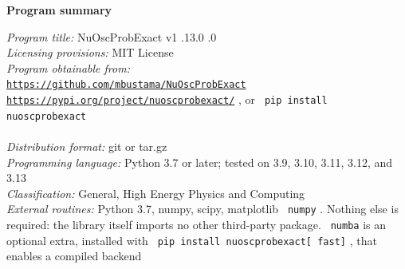 \documentclass[final,5p,times,twocolumn]{elsarticle}
\providecommand{\DIFaddtex}[1]{{\protect\color{blue} \sf #1}} %
\providecommand{\DIFdeltex}[1]{{\protect\color{red} \scriptsize #1}} %
\providecommand{\DIFaddbegin}{} %
\providecommand{\DIFaddend}{} %
\providecommand{\DIFdelbegin}{} %
\providecommand{\DIFdelend}{} %
\providecommand{\DIFadd}[1]{\DIFaddtex{#1}} %
\providecommand{\DIFdel}[1]{\DIFdeltex{#1}} %
\begin{document}
\noindent
{\bf Program summary}
\smallskip

\begin{small}

\noindent
{\em Program title:} NuOscProbExact v1\DIFaddbegin \DIFadd{.13}\DIFaddend .0    \DIFdelbegin \DIFdel{.0    }\DIFdelend \\
\smallskip
{\em Licensing provisions:} MIT License  \\
\smallskip
{\em Program obtainable from:} \\
\href{https://github.com/mbustama/NuOscProbExact}{\tt https://github.com/mbustama/NuOscProbExact}  \\
\DIFaddbegin \href{https://pypi.org/project/nuoscprobexact/}{\tt https://pypi.org/project/nuoscprobexact/}\DIFadd{, or }{\tt \DIFadd{pip install nuoscprobexact}}  \DIFaddend \\ \DIFaddbegin \\
\DIFaddend \smallskip
\DIFaddbegin {\em \DIFadd{Distribution format:}} \DIFadd{git or tar.gz }\\
\smallskip
\DIFaddend %
{\em Programming language:} Python \DIFdelbegin \DIFdel{3.7   }\DIFdelend \DIFaddbegin \DIFadd{3.9 or later; tested on 3.9, 3.10, 3.11, 3.12, and 3.13   }\DIFaddend \\
\smallskip
\DIFaddbegin {\em \DIFadd{Classification:}} \DIFadd{11.1 General, High Energy Physics and Computing   }\\
\smallskip
\DIFaddend %
{\em External routines:} \DIFdelbegin \DIFdel{Python 3.7, numpy, scipy, matplotlib   }\DIFdelend \DIFaddbegin {\tt \DIFadd{numpy}}\DIFadd{.  Nothing else is required: the library itself imports no other third-party package.  }{\tt \DIFadd{numba}} \DIFadd{is an optional extra, installed with }{\tt \DIFadd{pip install nuoscprobexact}[\DIFadd{fast}]}\DIFadd{, that enables a compiled backend   }\DIFaddend \\

\end{small}
\end{document}
